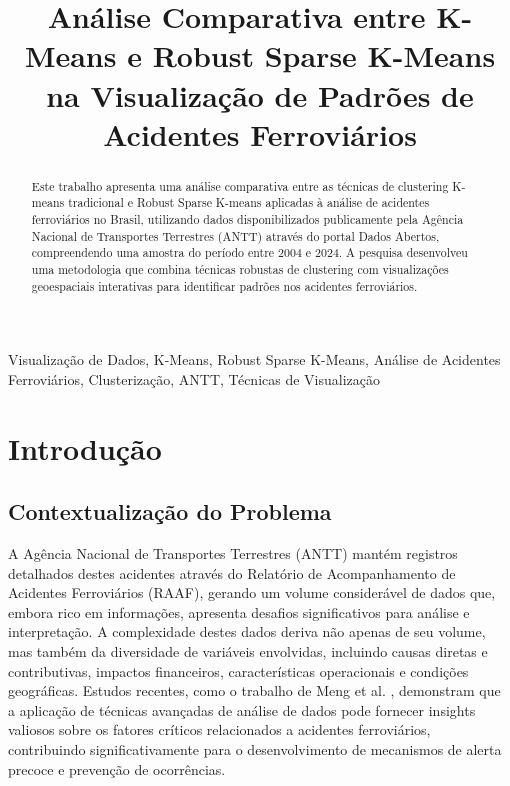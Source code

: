 \documentclass[conference]{IEEEtran}
\begin{document}
\title{Análise Comparativa entre K-Means e Robust Sparse K-Means na Visualização de Padrões de Acidentes Ferroviários}

\author{
}

\maketitle

\begin{abstract}
Este trabalho apresenta uma análise comparativa entre as técnicas de clustering K-means tradicional e Robust Sparse K-means aplicadas à análise de acidentes ferroviários no Brasil, utilizando dados disponibilizados publicamente pela Agência Nacional de Transportes Terrestres (ANTT) através do portal Dados Abertos, compreendendo uma amostra do período entre 2004 e 2024. A pesquisa desenvolveu uma metodologia que combina técnicas robustas de clustering com visualizações geoespaciais interativas para identificar padrões nos acidentes ferroviários.
\end{abstract}

\begin{IEEEkeywords}
Visualização de Dados, K-Means, Robust Sparse K-Means, Análise de Acidentes Ferroviários, Clusterização, ANTT, Técnicas de Visualização
\end{IEEEkeywords}

\section{Introdução}
\subsection{Contextualização do Problema}

A Agência Nacional de Transportes Terrestres (ANTT) mantém registros detalhados destes acidentes através do Relatório de Acompanhamento de Acidentes Ferroviários (RAAF), gerando um volume considerável de dados que, embora rico em informações, apresenta desafios significativos para análise e interpretação. A complexidade destes dados deriva não apenas de seu volume, mas também da diversidade de variáveis envolvidas, incluindo causas diretas e contributivas, impactos financeiros, características operacionais e condições geográficas. Estudos recentes, como o trabalho de Meng et al. \cite{b6}, demonstram que a aplicação de técnicas avançadas de análise de dados pode fornecer insights valiosos sobre os fatores críticos relacionados a acidentes ferroviários, contribuindo significativamente para o desenvolvimento de mecanismos de alerta precoce e prevenção de ocorrências.
\end{document}
